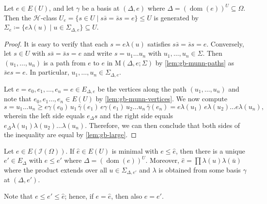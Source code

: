 \documentclass[anonymous,letter,UKenglish,cleveref,autoref,thm-restate]{lipics-v2021}
\renewcommand{\geq}{\geqslant}
\renewcommand{\leq}{\leqslant}
\renewcommand{\ge}{\geq}
\newcommand{\sse}{\subseteq}
\newcommand{\dom}{\operatorname{dom}}
\newcommand{\ISym}{\cI}
\newcommand*{\gH}[1][]{\mathrel{\mathcal{H}_{#1}}}
\newcommand{\cI}{\mathcal{I}}
\theoremstyle{plain}
\theoremstyle{plain}
\begin{document}
\begin{lemma}\label{lem:gb-munn-hclass}
  Let $e \in E(U)$, and let $\gamma$ be a basis at $(\Delta, e)$ where $\Delta = (\dom(e))^U \sse \Omega$.
  Then the $\gH$-class $U_e = \{s \in U \mid s\bar s = \bar s s = e\} \leq U$ is generated by $\Sigma_e \coloneqq \{ e \lambda(u) \mid u \in \Sigma_{\Delta, e}\} \sse U$.
\end{lemma}

\begin{proof}
  It is easy to verify that each $s = e\lambda(u)$ satisfies $s \bar s = \bar s s = e$.
  Conversely, let $s \in U$ with $s\bar s = \bar s s = e$ and write $s = u_1 \dotsc u_n$ with $u_1, \dotsc, u_n \in \Sigma$.
  Then $(u_1, \dotsc, u_n)$ is a path from $e$ to $e$ in $\mathrm{M}(\Delta, e; \Sigma)$ by \cref{lem:gb-munn-paths} as $\bar s e s = e$.
  In particular, $u_1, \dotsc, u_n \in \Sigma_{\Delta, e}$.

  Let $e = e_0, e_1, \dotsc, e_n = e \in E_{\Delta,e}$ be the vertices along the path $(u_1, \dotsc, u_n)$ and note that $e_0, e_1 \dotsc, e_n \in E(U)$ by \cref{lem:gb-munn-vertices}.
  We now compute 
  \[
    s = u_1 \dotsc u_n \ge e\gamma(e_0) \, u_1 \, \bar\gamma(e_1) \, e \gamma(e_1) \, u_2 \dotsc u_n \, \bar\gamma(e_n) = e\lambda(u_1)\, e\lambda(u_2) \dotsc e\lambda(u_n),
  \]
  wherein the left side equals $e_\Delta s$ and the right side equals $e_\Delta \lambda(u_1)\lambda(u_2) \dotsc \lambda(u_n)$.
  Therefore, we can then conclude that both sides of the inequality are equal by \cref{lem:gb-large}.
\end{proof}


\begin{lemma}\label{lem:gb-munn-idempotent}
  Let $e \in E(\ISym(\Omega))$.
   If $\hat e \in E(U)$ is minimal with $e \leq \hat e$, then there is a unique $e' \in E_\Delta$ with $e \leq e'$ where $\Delta = (\dom(e))^U$.
  Moreover, $\hat e = \prod \lambda(u)\lambda(\bar u)$ where the product extends over all $u \in \Sigma_{\Delta, e'}$ and $\lambda$ is obtained from some basis $\gamma$ at $(\Delta, e')$.
\end{lemma}

Note that $e \leq e' \leq \hat e$; hence, if $e= \hat e$, then also $e = e'$.
\end{document}
